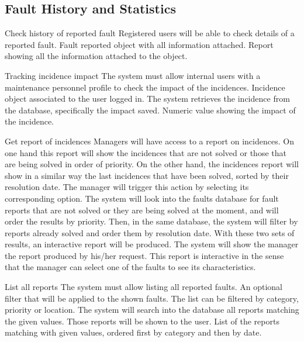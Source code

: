 \subsection{Fault History and Statistics}

\begin{requirement}{Check history of reported fault}
\reqdesc Registered users will be able to check details of a reported fault.
\reqin Fault reported object with all information attached.
\reqout Report showing all the information attached to the object.
\end{requirement}

\begin{requirement}{Tracking incidence impact}
\reqdesc The system must allow internal users with a maintenance personnel profile to check the impact of the incidences.
\reqin Incidence object associated to the user logged in.
\reqsteps The system retrieves the incidence from the database, specifically the impact saved.
\reqout Numeric value showing the impact of the incidence.
\end{requirement}

\begin{requirement}{Get report of incidences}
\reqdesc Managers will have access to a report on incidences. On one hand this report will show the incidences that are not solved or those that are being solved in order of priority. On the other hand, the incidences report will show in a similar way the last incidences that have been solved, sorted by
their resolution date.
\reqin The manager will trigger this action by selecting its corresponding option.
\reqsteps The system will look into the faults database for fault reports that are not solved or they are being solved at the moment, and will order the results by priority. Then, in the same database, the system will filter by reports already solved and order them by resolution date. With these two sets of results, an interactive report will be produced.
\reqout The system will show the manager the report produced by his/her request. This report is interactive in the sense that the manager can select one of the faults to see its characteristics.
\end{requirement}

\begin{requirement}{List all reports}\label{A4-ListAllReports}
\reqdesc The system must allow listing all reported faults.
\reqin An optional filter that will be applied to the shown faults. The list can be filtered by category, priority or location.
\reqsteps The system will search into the database all reports matching the given values. Those reports will be shown to the user.
\reqout List of the reports matching with given values, ordered first by category and then by date.
\end{requirement}


